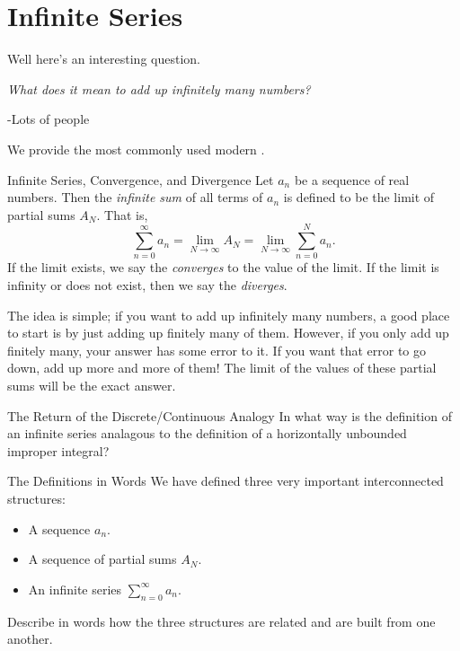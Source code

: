 \section{Infinite Series}
Well here's an interesting question.
\begin{center}
\emph{What does it mean to add up infinitely many numbers?}

\parindent \parindent -Lots of people
\end{center}

We provide the most commonly used modern .

\begin{definition}{Infinite Series, Convergence, and Divergence}
Let $a_n$ be a sequence of real numbers.  Then the \emph{infinite sum} of all terms of $a_n$ is defined to be the limit of partial sums $A_N$.  That is, 
$$\sum_{n=0}^\infty a_n = \lim_{N\rightarrow \infty} A_N = \lim_{N\rightarrow \infty} \sum_{n=0}^N a_n. $$
If the limit exists, we say the  \emph{converges} to the value of the limit.  If the limit is infinity or does not exist, then we say the  \emph{diverges}. 
\end{definition}

The idea is simple; if you want to add up infinitely many numbers, a good place to start is by just adding up finitely many of them.  However, if you only add up finitely many, your answer has some error to it.  If you want that error to go down, add up more and more of them!  The limit of the values of these partial sums will be the exact answer.

\begin{exercise}{The Return of the Discrete/Continuous Analogy \Coffeecup \Coffeecup \Coffeecup} In what way is the definition of an infinite series analagous to the definition of a horizontally unbounded improper integral?
\end{exercise}

\begin{exercise}{The Definitions in Words \Coffeecup \Coffeecup}
We have defined three very important interconnected structures: 
\begin{itemize}
\item A sequence $a_n$.
\item A sequence of partial sums $A_N$.
\item An infinite series $\sum_{n=0}^\infty a_n$.
\end{itemize}
Describe in words how the three structures are related and are built from one another.
\vspace*{1in}
 \end{exercise}
 
